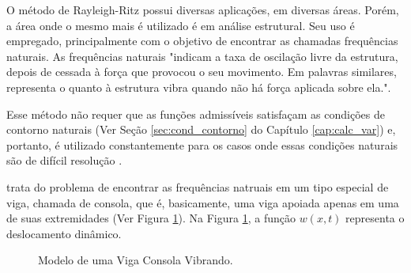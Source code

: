 \documentclass[
	12pt,				%
	openright,			%
    twoside,			%
	a4paper,			%
	english,			%
	french,				%
	spanish,			%
	brazil				%
	]{abntex2}
\numberwithin{lema}{chapter}
\numberwithin{teorema}{chapter}
\numberwithin{definicao}{chapter}
\numberwithin{exemplo}{chapter}
\numberwithin{figure}{chapter}
\begin{document}
O método de Rayleigh-Ritz possui diversas aplicações, em diversas áreas. Porém, a área onde o mesmo mais é utilizado é em análise estrutural. Seu uso é empregado, principalmente com o objetivo de encontrar as chamadas frequências naturais. As frequências naturais "indicam a taxa de oscilação livre da estrutura, depois de cessada à força que provocou o seu movimento. Em palavras similares, representa o quanto à estrutura vibra quando não há força aplicada sobre ela."\text{ }\cite[p. 1]{Vasquez2015}.

Esse método não requer que as funções admissíveis satisfaçam as condições de contorno naturais (Ver Seção \ref{sec:cond_contorno} do Capítulo \ref{cap:calc_var}) e, portanto, é utilizado constantemente para os casos onde essas condições naturais são de difícil resolução \cite{GROSSI_2001}.

 trata do problema de encontrar as frequências natruais em um tipo especial de viga, chamada de consola, que é, basicamente, uma viga apoiada apenas em uma de suas extremidades (Ver Figura \ref{fig:cantilever}). Na Figura \ref{fig:cantilever}, a função $w(x,t)$ representa o deslocamento dinâmico.

\begin{figure}
	\caption{Modelo de uma Viga Consola Vibrando.}
	\centering
	\label{fig:cantilever}
\end{figure}
\end{document}
